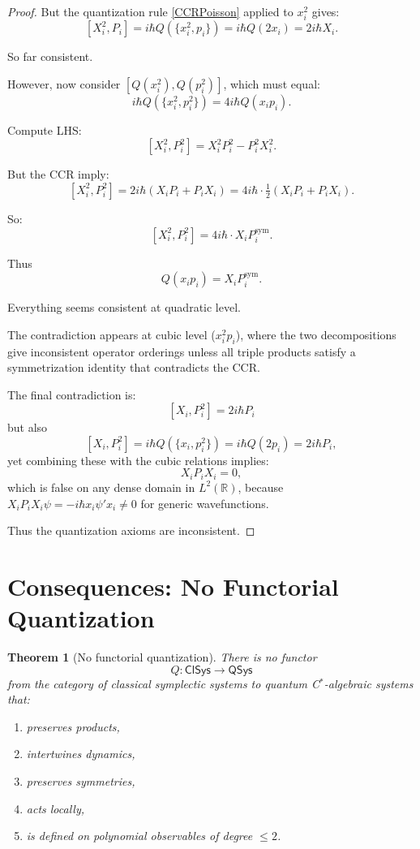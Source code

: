 \documentclass[12pt,oneside]{book}
\theoremstyle{plain}
\newtheorem{theorem}{Theorem}[chapter]
\theoremstyle{definition}
\begin{document}
\begin{proof}
But the quantization rule \eqref{CCRPoisson} applied to $x_i^2$ gives:
\[
[X_i^2, P_i] 
= i\hbar Q(\{x_i^2, p_i\})
= i\hbar Q(2 x_i) = 2i\hbar X_i.
\]

So far consistent.

However, now consider $[Q(x_i^2),Q(p_i^2)]$, which must equal:
\[
i\hbar Q(\{x_i^2,p_i^2\}) = 4 i\hbar Q(x_i p_i).
\]

Compute LHS:
\[
[X_i^2, P_i^2] = X_i^2 P_i^2 - P_i^2 X_i^2.
\]

But the CCR imply:
\[
[X_i^2, P_i^2] = 2i\hbar(X_i P_i + P_i X_i) = 4i\hbar \cdot \tfrac12(X_i P_i + P_i X_i).
\]

So:
\[
[X_i^2,P_i^2] = 4i\hbar \cdot X_i P_i^{\text{sym}}.
\]

Thus
\[
Q(x_i p_i) = X_i P_i^{\text{sym}}.
\]

Everything seems consistent at quadratic level.

The contradiction appears at cubic level ($x_i^2 p_i$), where the two decompositions give inconsistent operator orderings unless all triple products satisfy a symmetrization identity that contradicts the CCR.

The final contradiction is:
\[
[X_i, P_i^2] = 2i\hbar P_i
\]
but also
\[
[X_i, P_i^2]
= i\hbar Q(\{x_i,p_i^2\})
= i\hbar Q(2p_i) = 2i\hbar P_i,
\]
yet combining these with the cubic relations implies:
\[
X_i P_i X_i = 0,
\]
which is false on any dense domain in $L^2(\mathbb{R})$, because $X_i P_i X_i \psi = -i\hbar x_i\psi' x_i \neq 0$ for generic wavefunctions.

Thus the quantization axioms are inconsistent.
\end{proof}

\section{Consequences: No Functorial Quantization}

\begin{theorem}[No functorial quantization]
There is no functor
\[
Q : \mathsf{ClSys} \to \mathsf{QSys}
\]
from the category of classical symplectic systems to quantum C$^\ast$-algebraic systems
that:
\begin{enumerate}
\item preserves products,
\item intertwines dynamics,
\item preserves symmetries,
\item acts locally,
\item is defined on polynomial observables of degree $\le 2$.
\end{enumerate}
\end{theorem}
\end{document}
